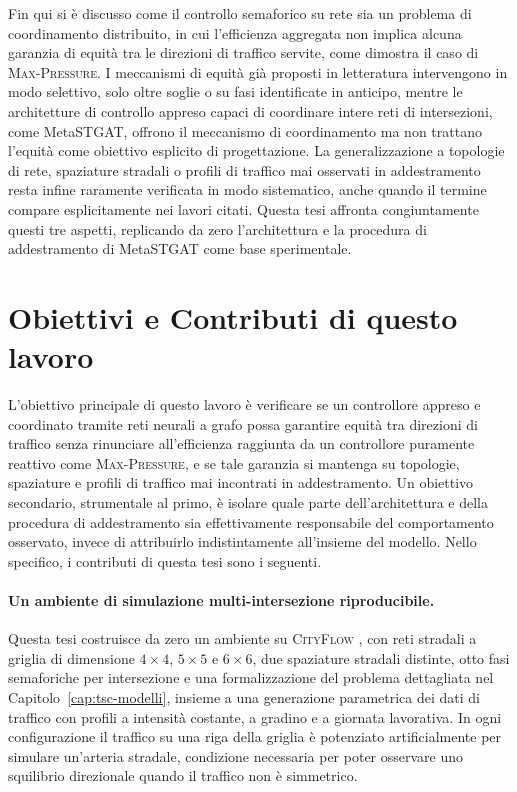 Fin qui si è discusso come il controllo semaforico su rete sia un
problema di coordinamento distribuito, in cui l'efficienza aggregata non
implica alcuna garanzia di equità tra le direzioni di traffico servite,
come dimostra il caso di \textsc{Max-Pressure}. I meccanismi di equità
già proposti in letteratura intervengono in modo selettivo, solo oltre
soglie o su fasi identificate in anticipo, mentre le architetture di
controllo appreso capaci di coordinare intere reti di intersezioni, come
MetaSTGAT, offrono il meccanismo di coordinamento ma non trattano
l'equità come obiettivo esplicito di progettazione. La generalizzazione a
topologie di rete, spaziature stradali o profili di traffico mai
osservati in addestramento resta infine raramente verificata in modo
sistematico, anche quando il termine compare esplicitamente nei lavori
citati. Questa tesi affronta congiuntamente questi tre aspetti,
replicando da zero l'architettura e la procedura di addestramento di
MetaSTGAT come base sperimentale.

\section{Obiettivi e Contributi di questo lavoro}

L'obiettivo principale di questo lavoro è verificare se un controllore
appreso e coordinato tramite reti neurali a grafo possa garantire equità
tra direzioni di traffico senza rinunciare all'efficienza raggiunta da un
controllore puramente reattivo come \textsc{Max-Pressure}, e se tale
garanzia si mantenga su topologie, spaziature e profili di traffico mai
incontrati in addestramento. Un obiettivo secondario, strumentale al
primo, è isolare quale parte dell'architettura e della procedura di
addestramento sia effettivamente responsabile del comportamento
osservato, invece di attribuirlo indistintamente all'insieme del modello.
Nello specifico, i contributi di questa tesi sono i seguenti.

\paragraph{Un ambiente di simulazione multi-intersezione riproducibile.}
Questa tesi costruisce da zero un ambiente su \textsc{CityFlow}
\citep{zhang2019cityflow}, con reti stradali a griglia di dimensione
$4\times4$, $5\times5$ e $6\times6$, due spaziature stradali distinte,
otto fasi semaforiche per intersezione e una formalizzazione del
problema dettagliata nel Capitolo~\ref{cap:tsc-modelli}, insieme a una
generazione parametrica dei dati di traffico con profili a intensità
costante, a gradino e a giornata lavorativa. In ogni configurazione il
traffico su una riga della griglia è potenziato artificialmente per
simulare un'arteria stradale, condizione necessaria per poter osservare
uno squilibrio direzionale quando il traffico non è simmetrico.

